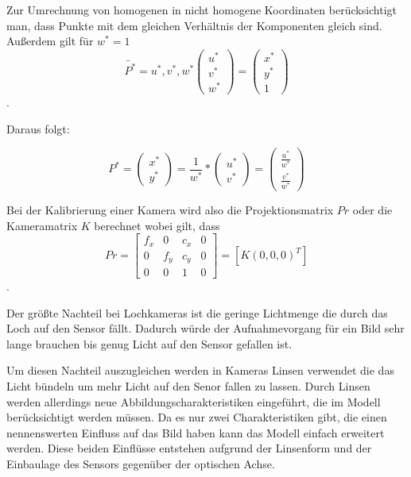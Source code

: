 Zur Umrechnung von homogenen in nicht homogene Koordinaten berücksichtigt man, dass Punkte mit dem gleichen Verhältnis der Komponenten
gleich sind. Außerdem gilt für $w^*=1$
\begin{equation}
	\tilde{P^*}=u^*,v^*,w^*
	\begin{pmatrix}
	  u^*\\v^*\\w^*
	\end{pmatrix}
	=
	\begin{pmatrix}
	  x^*\\y^*\\1
	\end{pmatrix}
\end{equation}.

Daraus folgt:

\begin{equation}
	P^*=
	\begin{pmatrix}
	  x^*\\
	  y^*
	\end{pmatrix}
	=
	\frac{1}{w^*}*
	\begin{pmatrix}
	  u^*\\
	  v^*
	\end{pmatrix}
	=
	\begin{pmatrix}
	  \frac{u^*}{w^*}\\
	  \frac{v^*}{w^*}
	\end{pmatrix}
\end{equation}

Bei der Kalibrierung einer Kamera wird also die Projektionsmatrix $Pr$ oder die
Kameramatrix $K$ berechnet wobei gilt, dass 
\begin{equation}
  Pr=
  \begin{bmatrix}
    f_x&0&c_x&0\\
    0&f_y&c_y&0\\
    0&0&1&0
  \end{bmatrix}
  =
  \left[K \left(0,0,0\right)^T\right]
\end{equation}.

Der größte Nachteil bei Lochkameras ist die geringe Lichtmenge die durch das Loch
auf den Sensor fällt. Dadurch würde der Aufnahmevorgang für ein Bild sehr lange
brauchen bis genug Licht auf den Sensor gefallen ist.

Um diesen Nachteil auszugleichen werden in Kameras Linsen verwendet die das Licht
bündeln um mehr Licht auf den Senor fallen zu lassen. Durch Linsen werden allerdings 
neue Abbildungscharakteristiken eingeführt, die im Modell berücksichtigt werden müssen.
Da es nur zwei Charakteristiken gibt, die einen nennenswerten Einfluss auf das Bild haben
kann das Modell einfach erweitert werden. Diese beiden Einflüsse entstehen aufgrund der
Linsenform und der Einbaulage des Sensors gegenüber der optischen Achse. 

